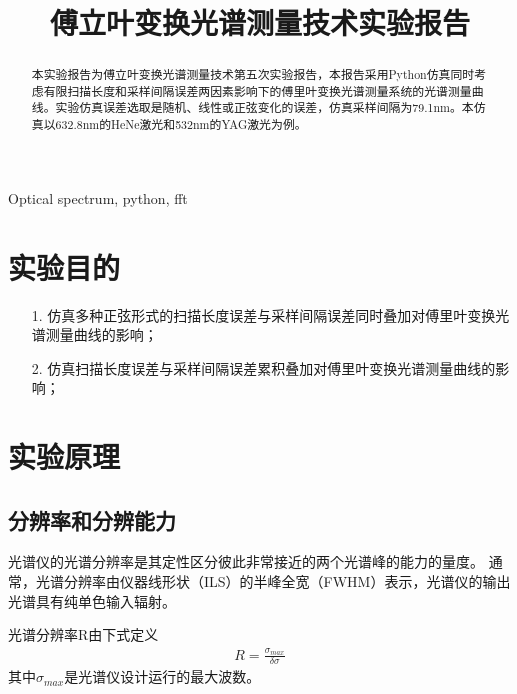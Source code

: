 \documentclass[conference]{IEEEtran}
\begin{document}
\title{傅立叶变换光谱测量技术实验报告}

\author{
}




\maketitle

\begin{abstract}
    本实验报告为傅立叶变换光谱测量技术第五次实验报告，本报告采用Python仿真同时考虑有限扫描长度和采样间隔误差两因素影响下的傅里叶变换光谱测量系统的光谱测量曲线。实验仿真误差选取是随机、线性或正弦变化的误差，仿真采样间隔为79.1nm。本仿真以632.8nm的HeNe激光和532nm的YAG激光为例。
\end{abstract}

\begin{IEEEkeywords}
    Optical spectrum, python, fft
\end{IEEEkeywords}

\section{实验目的}
\begin{itemize}
    \item[1.] 仿真多种正弦形式的扫描长度误差与采样间隔误差同时叠加对傅里叶变换光谱测量曲线的影响；
    \item[2.] 仿真扫描长度误差与采样间隔误差累积叠加对傅里叶变换光谱测量曲线的影响； 
\end{itemize} 

\section{实验原理}
\subsection{分辨率和分辨能力}
光谱仪的光谱分辨率是其定性区分彼此非常接近的两个光谱峰的能力的量度。 通常，光谱分辨率由仪器线形状（ILS）的半峰全宽（FWHM）表示，光谱仪的输出光谱具有纯单色输入辐射。

光谱分辨率R由下式定义
\begin{align}
    R = \frac{\sigma_{max}}{\delta \sigma}
\end{align}
其中$\sigma_{max}$是光谱仪设计运行的最大波数。
\end{document}
